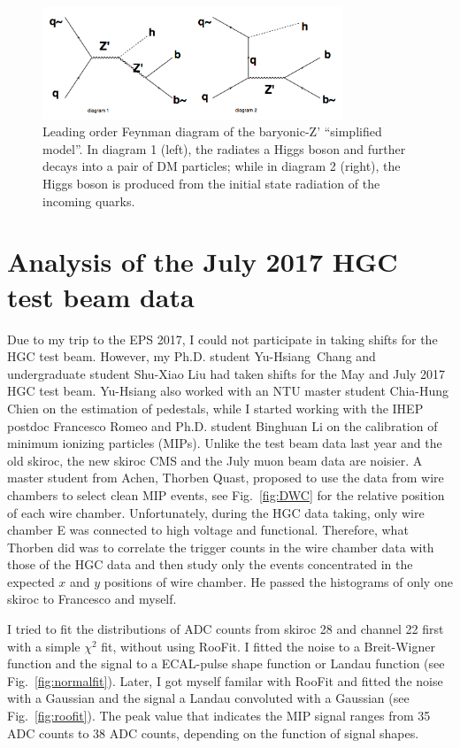 \begin{figure}[htbp]
   \centering
   \includegraphics[width=0.8\textwidth]{baryonicZ.png}
   \caption{Leading order Feynman diagram of the baryonic-Z' ``simplified model''. In diagram 1 (left), the \cPZpr 
radiates a Higgs boson and further decays into a pair of DM particles; while in diagram 2 (right), the Higgs boson is 
produced from the initial state radiation of the incoming quarks.}
   \label{fig:transb}
\end{figure}


\section{Analysis of the July 2017 HGC test beam data}

Due to my trip to the EPS 2017, I could not participate in taking shifts for the HGC test beam. However, my Ph.D. student 
Yu-Hsiang~Chang and undergraduate student Shu-Xiao Liu had taken shifts for the May and July 2017 HGC test beam. 
Yu-Hsiang also worked with an NTU master student Chia-Hung Chien on the estimation of pedestals, while I started working 
with the IHEP postdoc Francesco Romeo and Ph.D. student Binghuan Li on the calibration of minimum ionizing particles 
(MIPs). Unlike the test beam data last year and the old skiroc, the new skiroc CMS and the July muon beam data are 
noisier. A master student from Achen, Thorben Quast, proposed to use the data from wire chambers to select clean MIP 
events, see Fig.~\ref{fig:DWC} for the relative position of each wire chamber. Unfortunately, during the HGC data taking, 
only wire chamber E was connected to high voltage and functional. Therefore, what Thorben did was to correlate the 
trigger counts in the wire chamber data with those of the HGC data and then study only the events concentrated in the 
expected $x$ and $y$ positions of wire chamber. He passed the histograms of only one skiroc to Francesco and myself. 

I tried to fit the distributions of ADC counts from skiroc 28 and channel 22 first with a simple $\chi^2$ fit, 
without using RooFit. I fitted the noise to a Breit-Wigner function and the signal to a ECAL-pulse shape function or 
Landau function (see Fig.~\ref{fig:normalfit}). Later, I got myself familar with RooFit and fitted the 
noise with a Gaussian and the signal a Landau convoluted with a Gaussian (see Fig.~\ref{fig:roofit}). 
The peak value that indicates the MIP signal ranges from 35 ADC counts to 38 ADC counts, depending on the function of 
signal shapes. 


